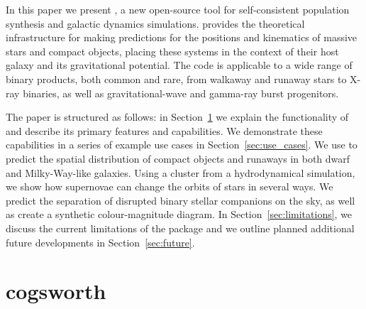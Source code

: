 \documentclass[twocolumn, twocolappendix, oneside]{aastex631}
\begin{document}

In this paper we present \cogsworth, a new open-source tool for self-consistent population synthesis and galactic dynamics simulations. \cogsworth provides the theoretical infrastructure for making predictions for the positions and kinematics of massive stars and compact objects, placing these systems in the context of their host galaxy and its gravitational potential. The code is applicable to a wide range of binary products, both common and rare, from walkaway and runaway stars to X-ray binaries, as well as gravitational-wave and gamma-ray burst progenitors.

The paper is structured as follows: in Section~\ref{sec:cogsworth} we explain the functionality of \cogsworth and describe its primary features and capabilities. We demonstrate these capabilities in a series of example use cases in Section~\ref{sec:use_cases}. We use \cogsworth to predict the spatial distribution of compact objects and runaways in both dwarf and Milky-Way-like galaxies. Using a cluster from a hydrodynamical simulation, we show how supernovae can change the orbits of stars in several ways. We predict the separation of disrupted binary stellar companions on the sky, as well as create a synthetic \gaia colour-magnitude diagram. In Section~\ref{sec:limitations}, we discuss the current limitations of the package and we outline planned additional future developments in Section~\ref{sec:future}.

\section{cogsworth}\label{sec:cogsworth}
\end{document}
